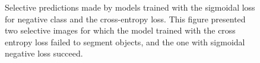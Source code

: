 \begin{figure}
\begin{minipage}{\columnwidth}
  \end{minipage}
\caption{
Selective predictions made by models trained with the sigmoidal loss for negative class and the cross-entropy loss.
This figure presented two selective images for which the model trained with the cross entropy loss failed to segment objects, and the one with sigmoidal negative loss succeed.
}
\label{fig:pusegment}
\end{figure}
